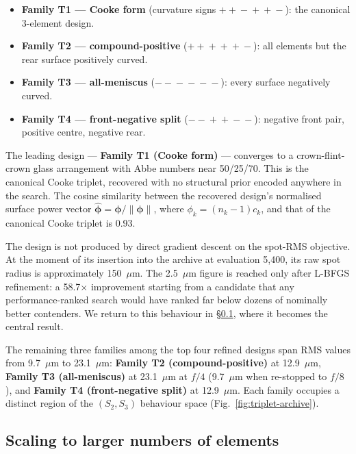\begin{itemize}\itemsep0pt
    \item \textbf{Family T1 — Cooke form} (curvature signs $+\!+\!-\!+\!+\!-$): the canonical 3-element design.
    \item \textbf{Family T2 — compound-positive} ($+\!+\!+\!+\!+\!-$): all elements but the rear surface positively curved.
    \item \textbf{Family T3 — all-meniscus} ($-\!-\!-\!-\!-\!-$): every surface negatively curved.
    \item \textbf{Family T4 — front-negative split} ($-\!-\!+\!+\!-\!-$): negative front pair, positive centre, negative rear.
\end{itemize}

The leading design — \textbf{Family T1 (Cooke form)} — converges to a crown-flint-crown glass arrangement with Abbe numbers near 50/25/70. This is the canonical Cooke triplet, recovered with no structural prior encoded anywhere in the search. The cosine similarity between the recovered design's normalised surface power vector $\hat{\boldsymbol{\phi}} = \boldsymbol{\phi}/\lVert \boldsymbol{\phi} \rVert$, where $\phi_k = (n_k - 1)c_k$, and that of the canonical Cooke triplet is 0.93.

The design is not produced by direct gradient descent on the spot-RMS objective. At the moment of its insertion into the archive at evaluation 5{,}400, its raw spot radius is approximately 150~$\mu$m. The 2.5~$\mu$m figure is reached only after L-BFGS refinement: a 58.7$\times$ improvement starting from a candidate that any performance-ranked search would have ranked far below dozens of nominally better contenders. We return to this behaviour in \S\ref{sec:results-scaling}, where it becomes the central result.

The remaining three families among the top four refined designs span RMS values from 9.7~$\mu$m to 23.1~$\mu$m: \textbf{Family T2 (compound-positive)} at 12.9~$\mu$m, \textbf{Family T3 (all-meniscus)} at 23.1~$\mu$m at $f/4$ (9.7~$\mu$m when re-stopped to $f/8$), and \textbf{Family T4 (front-negative split)} at 12.9~$\mu$m. Each family occupies a distinct region of the $(S_2, S_3)$ behaviour space (Fig.~\ref{fig:triplet-archive}).

\subsection{Scaling to larger numbers of elements}
\label{sec:results-scaling}

